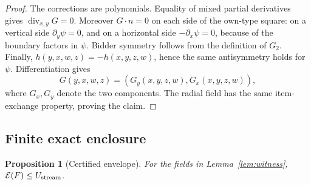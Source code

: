 \documentclass[11pt]{article}
\newtheorem{proposition}[theorem]{Proposition}
\newcommand{\Ustream}{U_{\rm stream}}
\begin{document}
\begin{proof}
The corrections are polynomials.  Equality of mixed partial derivatives gives
\(\operatorname{div}_{x,y}G=0\).  Moreover \(G\cdot n=0\) on each side of
the own-type square: on a vertical side \(\partial_y\psi=0\), and on a
horizontal side \(-\partial_x\psi=0\), because of the boundary factors in
\(\psi\).  Bidder symmetry follows from the definition of \(G_2\).  Finally,
\(h(y,x,w,z)=-h(x,y,z,w)\), hence the same antisymmetry holds for \(\psi\).
Differentiation gives
\[
G(y,x,w,z)=(G_y(x,y,z,w),G_x(x,y,z,w)),
\]
where \(G_x,G_y\) denote the two components.  The radial field has the same
item-exchange property, proving the claim.
\end{proof}

\subsection{Finite exact enclosure}\label{subsec:enclosure}

\begin{proposition}[Certified envelope]\label{prop:enclosure}
For the fields in Lemma~\ref{lem:witness},
\(\mathcal E(F)\leq\Ustream\).
\end{proposition}
\end{document}
